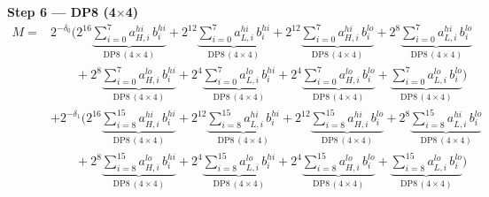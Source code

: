 \documentclass[fleqn]{article}
\newcommand{\DPop}[3]{\mathrm{DP#1}\,(#2\!\times\!#3)}
\begin{document}
\textbf{Step 6 --- DP8 (4$\times$4)}
\begin{align*}
M = {}
  & 2^{-\delta_0}\Big( 2^{16}\underbrace{\sum_{i=0}^{7} a_{H,i}^{hi}\, b_i^{hi}}_{\DPop{8}{4}{4}}
  + 2^{12}\underbrace{\sum_{i=0}^{7} a_{L,i}^{hi}\, b_i^{hi}}_{\DPop{8}{4}{4}}
  + 2^{12}\underbrace{\sum_{i=0}^{7} a_{H,i}^{hi}\, b_i^{lo}}_{\DPop{8}{4}{4}}
  + 2^{8}\underbrace{\sum_{i=0}^{7} a_{L,i}^{hi}\, b_i^{lo}}_{\DPop{8}{4}{4}} \\[0.15em]
  & \qquad + 2^{8}\underbrace{\sum_{i=0}^{7} a_{H,i}^{lo}\, b_i^{hi}}_{\DPop{8}{4}{4}}
  + 2^{4}\underbrace{\sum_{i=0}^{7} a_{L,i}^{lo}\, b_i^{hi}}_{\DPop{8}{4}{4}}
  + 2^{4}\underbrace{\sum_{i=0}^{7} a_{H,i}^{lo}\, b_i^{lo}}_{\DPop{8}{4}{4}}
  + \underbrace{\sum_{i=0}^{7} a_{L,i}^{lo}\, b_i^{lo}}_{\DPop{8}{4}{4}} \Big) \\[0.3em]
  & + 2^{-\delta_1}\Big( 2^{16}\underbrace{\sum_{i=8}^{15} a_{H,i}^{hi}\, b_i^{hi}}_{\DPop{8}{4}{4}}
  + 2^{12}\underbrace{\sum_{i=8}^{15} a_{L,i}^{hi}\, b_i^{hi}}_{\DPop{8}{4}{4}}
  + 2^{12}\underbrace{\sum_{i=8}^{15} a_{H,i}^{hi}\, b_i^{lo}}_{\DPop{8}{4}{4}}
  + 2^{8}\underbrace{\sum_{i=8}^{15} a_{L,i}^{hi}\, b_i^{lo}}_{\DPop{8}{4}{4}} \\[0.15em]
  & \qquad + 2^{8}\underbrace{\sum_{i=8}^{15} a_{H,i}^{lo}\, b_i^{hi}}_{\DPop{8}{4}{4}}
  + 2^{4}\underbrace{\sum_{i=8}^{15} a_{L,i}^{lo}\, b_i^{hi}}_{\DPop{8}{4}{4}}
  + 2^{4}\underbrace{\sum_{i=8}^{15} a_{H,i}^{lo}\, b_i^{lo}}_{\DPop{8}{4}{4}}
  + \underbrace{\sum_{i=8}^{15} a_{L,i}^{lo}\, b_i^{lo}}_{\DPop{8}{4}{4}} \Big)
\end{align*}
\end{document}
